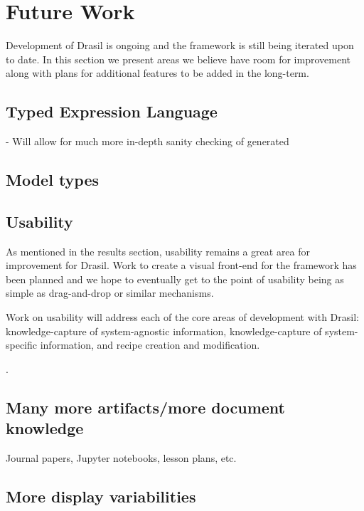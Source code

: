 \chapter{Future Work}
\label{c:future}

Development of Drasil is ongoing and the framework is still being iterated upon
to date. In this section we present areas we believe have room for improvement
along with plans for additional features to be added in the long-term.

\section{Typed Expression Language}
- Will allow for much more in-depth sanity checking of generated \sfs{}

\section{Model types}

\section{Usability}
As mentioned in the results section, usability remains a great area for
improvement for Drasil. Work to create a visual front-end for the framework
has been planned and we hope to eventually get to the point of usability being
as simple as drag-and-drop or similar mechanisms.

Work on usability will address each of the core areas of development with
Drasil: knowledge-capture of system-agnostic information,
knowledge-capture of system-specific information, and recipe creation and
modification.

.

\section{Many more artifacts/more document knowledge}

Journal papers, Jupyter notebooks, lesson plans, etc.

\section{More display variabilities}

